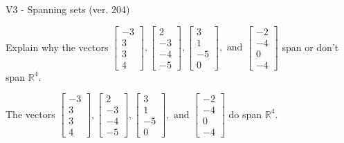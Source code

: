 \begin{exercise}
  \begin{exerciseTitle}V3 - Spanning sets (ver. 204)\end{exerciseTitle}
  \begin{exerciseStatement}
    Explain why the vectors \(\left[\begin{array}{r}
-3 \\
3 \\
3 \\
4
\end{array}\right] , \left[\begin{array}{r}
2 \\
-3 \\
-4 \\
-5
\end{array}\right] , \left[\begin{array}{r}
3 \\
1 \\
-5 \\
0
\end{array}\right] , \text{ and } \left[\begin{array}{r}
-2 \\
-4 \\
0 \\
-4
\end{array}\right]\) span or don't span \(\mathbb{R}^4\). 
	


  \end{exerciseStatement}
  \begin{exerciseAnswer}
   The vectors \(\left[\begin{array}{r}
-3 \\
3 \\
3 \\
4
\end{array}\right] , \left[\begin{array}{r}
2 \\
-3 \\
-4 \\
-5
\end{array}\right] , \left[\begin{array}{r}
3 \\
1 \\
-5 \\
0
\end{array}\right] , \text{ and } \left[\begin{array}{r}
-2 \\
-4 \\
0 \\
-4
\end{array}\right]\) 
  	 do  
	span \(\mathbb{R}^4\).
  


  \end{exerciseAnswer}
\end{exercise}